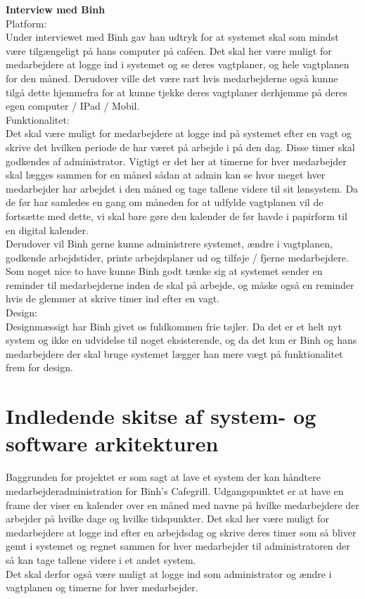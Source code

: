 \documentclass{article}
\begin{document}
\textbf{Interview med Binh} \\
Platform: \\
Under interviewet med Binh gav han udtryk for at systemet skal som mindst være tilgængeligt på hans computer på caféen. Det skal her være muligt for medarbejdere at logge ind i systemet og se deres vagtplaner, og hele vagtplanen for den måned. Derudover ville det være rart hvis medarbejderne også kunne tilgå dette hjemmefra for at kunne tjekke deres vagtplaner derhjemme på deres egen computer / IPad / Mobil. \\
Funktionalitet: \\
Det skal være muligt for medarbejdere at logge ind på systemet efter en vagt og skrive det hvilken periode de har været på arbejde i på den dag. Disse timer skal godkendes af administrator. Vigtigt er det her at timerne for hver medarbejder skal lægges sammen for en måned sådan at admin kan se hvor meget hver medarbejder har arbejdet i den måned og tage tallene videre til sit lønsystem. Da de før har samledes en gang om måneden for at udfylde vagtplanen vil de fortsætte med dette, vi skal bare gøre den kalender de før havde i papirform til en digital kalender. \\

Derudover vil Binh gerne kunne administrere systemet, ændre i vagtplanen, godkende arbejdstider, printe arbejdsplaner ud og tilføje / fjerne medarbejdere. \\
Som noget nice to have kunne Binh godt tænke sig at systemet sender en reminder til medarbejderne inden de skal på arbejde, og måske også en reminder hvis de glemmer at skrive timer ind efter en vagt. \\
Design: \\
Designmæssigt har Binh givet os fuldkommen frie tøjler. Da det er et helt nyt system og ikke en udvidelse til noget eksisterende, og da det kun er Binh og hans medarbejdere der skal bruge systemet lægger han mere vægt på funktionalitet frem for design. \\

\section{Indledende skitse af system- og software arkitekturen}
Baggrunden for projektet er som sagt at lave et system der kan håndtere medarbejderadministration for Binh’s Cafegrill. Udgangspunktet er at have en frame der viser en kalender over en måned med navne på hvilke medarbejdere der arbejder på hvilke dage og hvilke tidspunkter. Det skal her være muligt for medarbejdere at logge ind efter en arbejdsdag og skrive deres timer som så bliver gemt i systemet og regnet sammen for hver medarbejder til administratoren der så kan tage tallene videre i et andet system. \\
Det skal derfor også være muligt at logge ind som administrator og ændre i vagtplanen og timerne for hver medarbejder.	 \\
\end{document}
